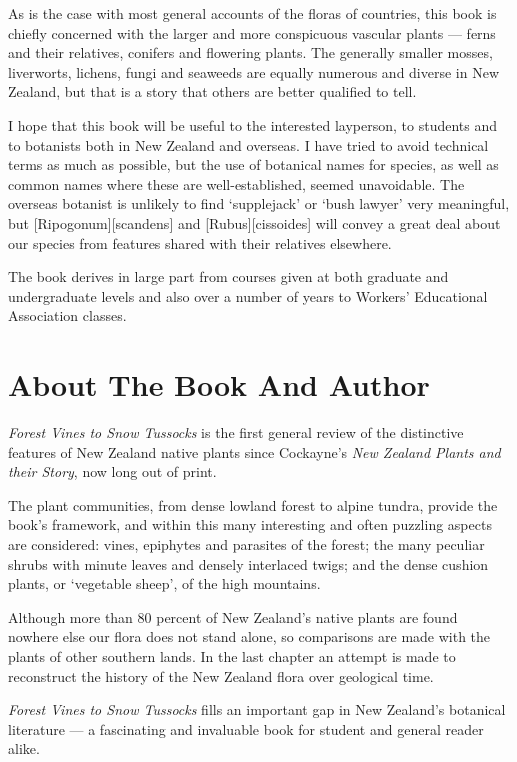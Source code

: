 As is the case with most general accounts of the floras of countries, this book is chiefly concerned with the larger and more conspicuous vascular plants --- ferns and their relatives, conifers and flowering plants.
The generally smaller mosses, liverworts, lichens, fungi and seaweeds are equally numerous and diverse in New Zealand, but that is a story that others are better qualified to tell.

I hope that this book will be useful to the interested layperson, to students and to botanists both in New Zealand and overseas.
I have tried to avoid technical terms as much as possible, but the use of botanical names for species, as well as common names where these are well-established, seemed unavoidable.
The overseas botanist is unlikely to find `supplejack' or `bush lawyer' very meaningful, but [Ripogonum][scandens] and [Rubus][cissoides] will convey a great deal about our species from features shared with their relatives elsewhere.

The book derives in large part from courses given at both graduate and undergraduate levels and also over a number of years to Workers' Educational Association classes.

\section*{About The Book And Author}

\emph{Forest Vines to Snow Tussocks} is the first general review of the distinctive features of New Zealand native plants since Cockayne's \emph{New Zealand Plants and their Story}, now long out of print.

The plant communities, from dense lowland forest to alpine tundra, provide the book's framework, and within this many interesting and often puzzling aspects are considered: vines, epiphytes and parasites of the forest; the many peculiar shrubs with minute leaves and densely interlaced twigs; and the dense cushion plants, or `vegetable sheep', of the high mountains.

Although more than 80 percent of New Zealand's native plants are found nowhere else our flora does not stand alone, so comparisons are made with the plants of other southern lands.
In the last chapter an attempt is made to reconstruct the history of the New Zealand flora over geological time.

\emph{Forest Vines to Snow Tussocks} fills an important gap in New Zealand's botanical literature — a fascinating and invaluable book for student and general reader alike.


